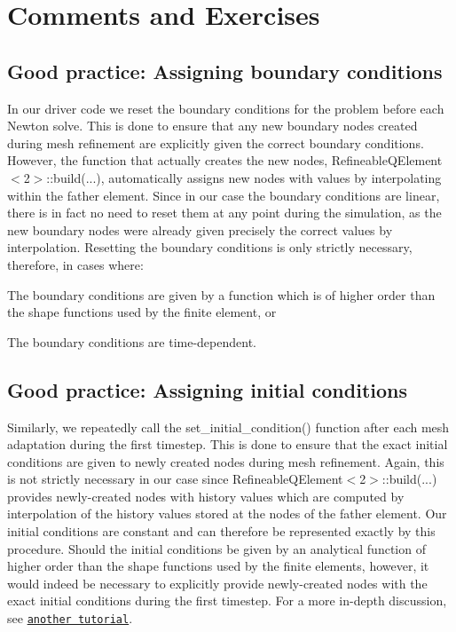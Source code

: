  

\hypertarget{index_comments}{}\section{Comments and Exercises}\label{index_comments}
\hypertarget{index_good_practice_bcs}{}\subsection{Good practice\+: Assigning boundary conditions}\label{index_good_practice_bcs}
In our driver code we reset the boundary conditions for the problem before each Newton solve. This is done to ensure that any new boundary nodes created during mesh refinement are explicitly given the correct boundary conditions. However, the function that actually creates the new nodes, {\ttfamily Refineable\+Q\+Element$<$2$>$\+::build}(...), automatically assigns new nodes with values by interpolating within the father element. Since in our case the boundary conditions are linear, there is in fact no need to reset them at any point during the simulation, as the new boundary nodes were already given precisely the correct values by interpolation. Resetting the boundary conditions is only strictly necessary, therefore, in cases where\+:


\begin{DoxyEnumerate}
\item The boundary conditions are given by a function which is of higher order than the shape functions used by the finite element, or
\item The boundary conditions are time-\/dependent.
\end{DoxyEnumerate}\hypertarget{index_good_practice_ics}{}\subsection{Good practice\+: Assigning initial conditions}\label{index_good_practice_ics}
Similarly, we repeatedly call the {\ttfamily set\+\_\+initial\+\_\+condition()} function after each mesh adaptation during the first timestep. This is done to ensure that the exact initial conditions are given to newly created nodes during mesh refinement. Again, this is not strictly necessary in our case since {\ttfamily Refineable\+Q\+Element$<$2$>$\+::build}(...) provides newly-\/created nodes with history values which are computed by interpolation of the history values stored at the nodes of the father element. Our initial conditions are constant and can therefore be represented exactly by this procedure. Should the initial conditions be given by an analytical function of higher order than the shape functions used by the finite elements, however, it would indeed be necessary to explicitly provide newly-\/created nodes with the exact initial conditions during the first timestep. For a more in-\/depth discussion, see \href{../../../unsteady_heat/two_d_unsteady_heat_adapt/html/index.html#spatial_adapt}{\tt another tutorial}.

